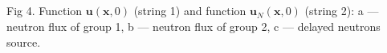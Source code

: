 \documentclass[landscape,a1paper,fontscale=0.5]{poster}
\begin{document}
\begin{poster}
{\begin{center}
\begin{minipage}{0.051\linewidth}
\center{~} \\
\end{minipage}
\hfill
\begin{minipage}{0.3\linewidth}
 \\
\end{minipage}
\hfill
\begin{minipage}{0.3\linewidth}
 \\
\end{minipage}
\hfill
\begin{minipage}{0.3\linewidth}
 \\
\end{minipage}
\hfill
Fig 4. Function $\bm u(\bm x, 0)$ (string 1) and function  $\bm u_N(\bm x, 0)$ (string 2): a --- neutron flux of group 1, b --- neutron flux of group 2, c --- delayed neutrons source.
\end{center}

}
\end{poster}
\end{document}
